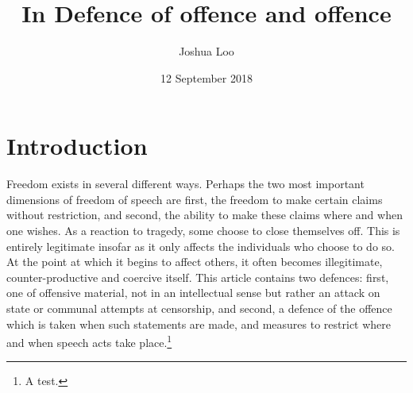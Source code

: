 \documentclass[10pt,a4paper,twoside]{article}
\begin{document}
\title{In Defence of offence and offence}
\author{Joshua Loo}
\date{12 September 2018}

\maketitle

\section{Introduction}

Freedom exists in several different ways. Perhaps the two most important
dimensions of freedom of speech are first, the freedom to make certain
claims without restriction, and second, the ability to make these claims
where and when one wishes. As a reaction to tragedy, some choose to
close themselves off. This is entirely legitimate insofar as it only
affects the individuals who choose to do so. At the point at which it
begins to affect others, it often becomes illegitimate,
counter-productive and coercive itself. This article contains two
defences: first, one of offensive material, not in an intellectual sense
but rather an attack on state or communal attempts at censorship, and
second, a defence of the offence which is taken when such statements are
made, and measures to restrict where and when speech acts take place.\footnote{A test.}
\end{document}
